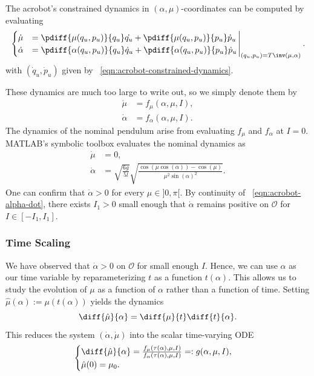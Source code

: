 The acrobot's constrained dynamics in
\((\alpha,\mu)\)-coordinates can be computed by evaluating
\begin{equation*}
\left.\begin{cases}
    \dot{\mu} &= \pdiff{\mu(q_u,p_u)}{q_u}\dot{q_u} +
         \pdiff{\mu(q_u,p_u)}{p_u}\dot{p}_u
    \\
    \dot{\alpha} &= \pdiff{\alpha(q_u,p_u)}{q_u}\dot{q}_u + 
        \pdiff{\alpha(q_u,p_u)}{p_u}\dot{p}_u
    \end{cases}\right|_{(q_u,p_u) = T\inv(\mu,\alpha)}
    .
\end{equation*}
with \((\dot{q}_u,\dot{p}_u)\) given by 
 ~\eqref{eqn:acrobot-constrained-dynamics}.

These dynamics are much too large to write out, so we simply denote them by
\begin{align}\label{eqn:acrobot-mu-dot}
    \dot{\mu} &= f_\mu(\alpha,\mu,I)
    ,\\
    \label{eqn:acrobot-alpha-dot}
    \dot{\alpha} &= f_\alpha(\alpha,\mu,I)
    .
\end{align}
The dynamics of the nominal pendulum arise from evaluating
\(f_\mu\) and \(f_\alpha\) at \(I = 0\).
MATLAB's symbolic toolbox evaluates the nominal dynamics as
\begin{align}\label{eqn:acrobot-mu-dot-nom}
    \dot{\mu} &= 0
    , \\
    \label{eqn:acrobot-alpha-dot-nom}
    \dot{\alpha} &= \sqrt{\frac{6g}{5l}} 
        \sqrt{\frac{\cos(\mu\cos(\alpha)) - \cos(\mu)}
            {\mu^2 \sin(\alpha)^2}}
    .
\end{align}
One can confirm that \(\dot{\alpha} > 0\) for every \(\mu \in ]0,\pi[\).
By continuity of ~\eqref{eqn:acrobot-alpha-dot}, there exists \(I_1 > 0\) small
enough that \(\dot{\alpha}\) remains positive on \(\mathcal{O}\) for 
\(I \in [-I_1,I_1]\).

\subsubsection*{Time Scaling}

We have observed that \(\dot{\alpha} > 0\) on \(\mathcal{O}\) for small enough \(I\). 
Hence, we can use \(\alpha\) as our time variable by reparameterizing \(t\) as a
function \(t(\alpha)\).
This allows us to study the evolution of \(\mu\) as a function of \(\alpha\)
rather than a function of time.
Setting \(\hat{\mu}(\alpha) := \mu(t(\alpha))\) yields the dynamics
\[
    \diff{\hat{\mu}}{\alpha} = 
    \diff{\mu}{t} \diff{t}{\alpha}
    .
\] 
This reduces the system \((\dot{\alpha},\dot{\mu})\) into the scalar
time-varying ODE 
\begin{equation}\label{eqn:muhat-dot}
    \begin{cases}
        \diff{\hat{\mu}}{\alpha} 
        = \frac{f_\mu(\tau(\alpha),\mu,I)}{f_\alpha(\tau(\alpha),\mu,I)}
        =: g(\alpha,\mu,I)
        , \\
        \hat{\mu}(0) = \mu_0
        .
    \end{cases}
\end{equation}

